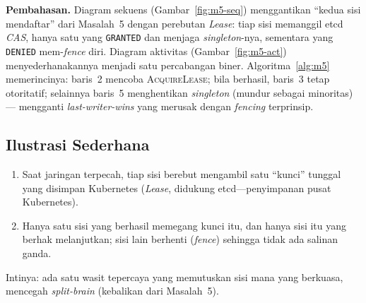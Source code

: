 \noindent\textbf{Pembahasan.} Diagram sekuens (Gambar~\ref{fig:m5-seq}) menggantikan
``kedua sisi mendaftar'' dari Masalah~5 dengan perebutan \emph{Lease}: tiap sisi memanggil
etcd \emph{CAS}, hanya satu yang \texttt{GRANTED} dan menjaga \emph{singleton}-nya,
sementara yang \texttt{DENIED} mem-\emph{fence} diri. Diagram aktivitas
(Gambar~\ref{fig:m5-act}) menyederhanakannya menjadi satu percabangan biner. Algoritma~\ref{alg:m5}
memerincinya: baris~2 mencoba \textsc{AcquireLease}; bila berhasil, baris~3 tetap
otoritatif; selainnya baris~5 menghentikan \emph{singleton} (mundur sebagai minoritas)---
mengganti \emph{last-writer-wins} yang merusak dengan \emph{fencing} terprinsip.

\subsection{Ilustrasi Sederhana}
\label{subsec:m5-ilustrasi}
\begin{enumerate}[nosep,leftmargin=2em]
  \item Saat jaringan terpecah, tiap sisi berebut mengambil satu ``kunci'' tunggal yang
        disimpan Kubernetes (\emph{Lease}, didukung etcd---penyimpanan pusat Kubernetes).
  \item Hanya satu sisi yang berhasil memegang kunci itu, dan hanya sisi itu yang berhak
        melanjutkan; sisi lain berhenti (\emph{fence}) sehingga tidak ada salinan ganda.
\end{enumerate}
\noindent Intinya: ada satu wasit tepercaya yang memutuskan sisi mana yang berkuasa,
mencegah \emph{split-brain} (kebalikan dari Masalah~5).

